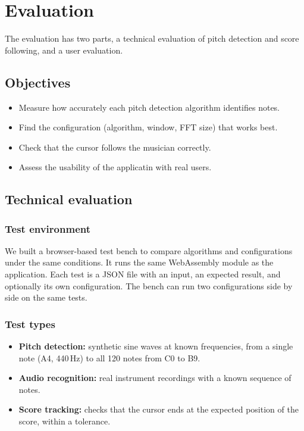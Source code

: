 \chapter{Evaluation}
\label{chap:evaluation}

The evaluation has two parts, a technical evaluation of pitch detection 
and score following, and a user evaluation.

\section{Objectives}

\begin{itemize}
	\item Measure how accurately each pitch detection algorithm identifies notes.
	\item Find the configuration (algorithm, window, FFT size) that works best.
	\item Check that the cursor follows the musician correctly.
	\item Assess the usability of the applicatin with real users.
\end{itemize}

\section{Technical evaluation}

\subsection{Test environment}
\label{subsec:test-env}

We built a browser-based test bench to compare algorithms and configurations 
under the same conditions. It runs the same WebAssembly module as the application.
Each test is a JSON file with an input, an expected result, and optionally its 
own configuration. The bench can run two configurations side by side on the same 
tests.


\subsection{Test types}

\begin{itemize}
	\item \textbf{Pitch detection:} synthetic sine waves at known frequencies, from a 
	single note (A4, 440\,Hz) to all 120 notes from C0 to B9.
	\item \textbf{Audio recognition:} real instrument recordings with a known sequence 
	of notes. 
	\item \textbf{Score tracking:} checks that the cursor ends at the expected position 
	of the score, within a tolerance. 
\end{itemize}


